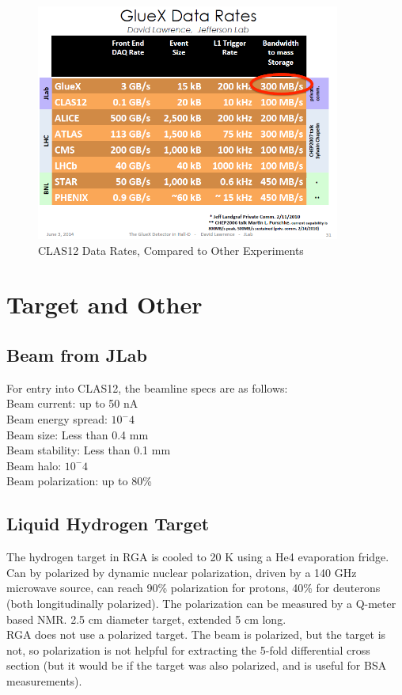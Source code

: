 			\begin{figure}[H]
    			\centering
    			\includegraphics[width=10cm]{CLAS-12/modules/clas-12-system/pics/other/good_data_rates_slide.PNG}
    			\caption{CLAS12 Data Rates, Compared to Other Experiments }
			\end{figure}
    
    \section{Target and Other}
        \subsection{Beam from JLab}
                For entry into CLAS12, the beamline specs are as follows:\\
                Beam current: up to 50 nA\\
                Beam energy spread: $10^-4$\\
                Beam size: Less than 0.4 mm\\
                Beam stability: Less than 0.1 mm\\
                Beam halo: $10^-4$\\
                Beam polarization: up to 80\%\\
        \subsection{Liquid Hydrogen Target}
            \indent The hydrogen target in RGA is cooled to 20 K using a He4 evaporation fridge. Can by polarized by dynamic nuclear polarization, driven by a 140 GHz microwave source, can reach 90\% polarization for protons, 40\% for deuterons (both longitudinally polarized). The polarization can be measured by a Q-meter based NMR. 2.5 cm diameter target, extended 5 cm long. \\
            \indent RGA does not use a polarized target. The beam is polarized, but the target is not, so polarization is not helpful for extracting the 5-fold differential cross section (but it would be if the target was also polarized, and is useful for BSA measurements).

